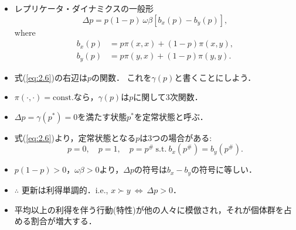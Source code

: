 \documentclass[uplatex,12pt,dvipdfmx,xcolor=svgnames]{beamer}
\begin{document}
\begin{frame}[t]{\secIII}

\begin{itemize}
	\item レプリケータ・ダイナミクスの一般形
		\begin{equation}
			\Delta p = p(1-p) \ \omega \beta
			\left[ b_x(p) - b_y(p) \right],
			\tag{2.6}
		\end{equation}
		where
		\begin{align}
			b_x(p) &= p\pi(x, x) + (1-p) \pi(x, y), \tag{2.4.x} \\
			b_y(p) &= p\pi(y, x) + (1-p) \pi(y, y). \tag{2.4.y}
		\end{align}
	\item 式(\ref{eq:2.6})の右辺は$p$の関数．
		これを$\gamma(p)$と書くことにしよう．
	\item $\pi(\cdot, \cdot) =\text{const.}$なら，$\gamma(p)$は$p$に関して3次関数．
	\vspace{5mm}
	\item $\Delta p = \gamma(p^*) =0$を満たす状態$p^*$を定常状態と呼ぶ．
	\item 式(\ref{eq:2.6})より，定常状態となる$p$は3つの場合がある:
		\begin{equation*}
			p=0,\quad
			p=1,\quad
			p=p^{\#}\ \text{s.t.} \ b_x(p^{\#}) = b_y(p^{\#}).
		\end{equation*}
	\vspace{0mm}
	\item $p(1-p) >0$，$\omega\beta >0$より，$\Delta p$の符号は$b_x-b_y$の符号に等しい．
	\item $\therefore$ 更新は利得単調的．i.e., $x \succ y\ \Longleftrightarrow \ \Delta p > 0$．
	\item 平均以上の利得を伴う行動(特性)が他の人々に模倣され，それが個体群を占める割合が増大する．
\end{itemize}



\end{frame}
\end{document}
